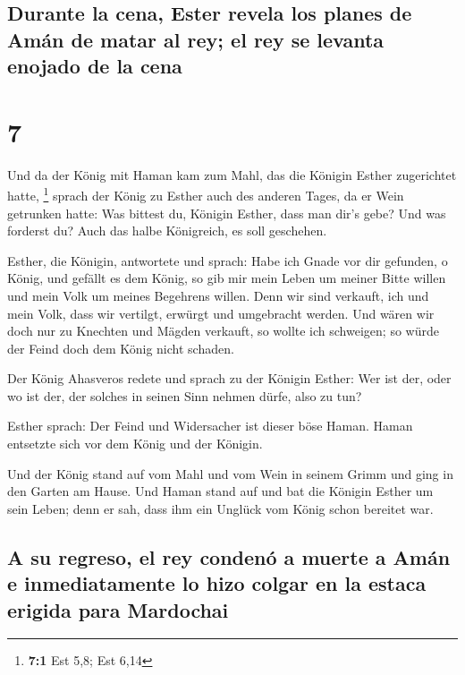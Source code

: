 \hypertarget{durante-la-cena-ester-revela-los-planes-de-amuxe1n-de-matar-al-rey-el-rey-se-levanta-enojado-de-la-cena}{%
\subsection{Durante la cena, Ester revela los planes de Amán de matar al
rey; el rey se levanta enojado de la
cena}\label{durante-la-cena-ester-revela-los-planes-de-amuxe1n-de-matar-al-rey-el-rey-se-levanta-enojado-de-la-cena}}

\hypertarget{section-6}{%
\section{7}\label{section-6}}

 Und da der König mit Haman kam zum Mahl, das die Königin
Esther zugerichtet hatte, \footnote{\textbf{7:1} Est 5,8; Est 6,14}
 sprach der König zu Esther auch des anderen Tages, da er
Wein getrunken hatte: Was bittest du, Königin Esther, dass man dir's
gebe? Und was forderst du? Auch das halbe Königreich, es soll geschehen.

 Esther, die Königin, antwortete und sprach: Habe ich
Gnade vor dir gefunden, o König, und gefällt es dem König, so gib mir
mein Leben um meiner Bitte willen und mein Volk um meines Begehrens
willen.  Denn wir sind verkauft, ich und mein Volk, dass
wir vertilgt, erwürgt und umgebracht werden. Und wären wir doch nur zu
Knechten und Mägden verkauft, so wollte ich schweigen; so würde der
Feind doch dem König nicht schaden.

 Der König Ahasveros redete und sprach zu der Königin
Esther: Wer ist der, oder wo ist der, der solches in seinen Sinn nehmen
dürfe, also zu tun?

 Esther sprach: Der Feind und Widersacher ist dieser böse
Haman. Haman entsetzte sich vor dem König und der Königin.

 Und der König stand auf vom Mahl und vom Wein in seinem
Grimm und ging in den Garten am Hause. Und Haman stand auf und bat die
Königin Esther um sein Leben; denn er sah, dass ihm ein Unglück vom
König schon bereitet war.

\hypertarget{a-su-regreso-el-rey-condenuxf3-a-muerte-a-amuxe1n-e-inmediatamente-lo-hizo-colgar-en-la-estaca-erigida-para-mardochai}{%
\subsection{A su regreso, el rey condenó a muerte a Amán e
inmediatamente lo hizo colgar en la estaca erigida para
Mardochai}\label{a-su-regreso-el-rey-condenuxf3-a-muerte-a-amuxe1n-e-inmediatamente-lo-hizo-colgar-en-la-estaca-erigida-para-mardochai}}

